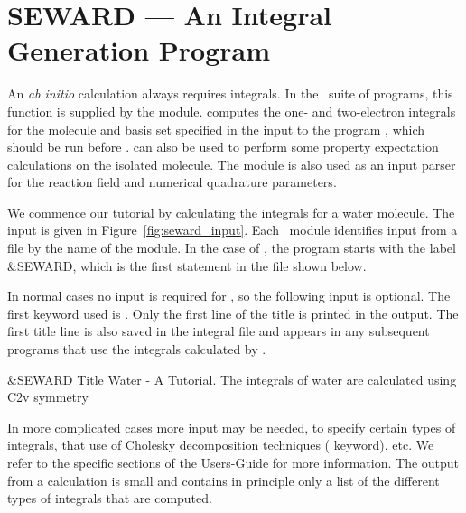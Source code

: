 \section{SEWARD --- An Integral Generation Program}
\label{TUT:sec:seward}

An {\em ab initio} calculation always requires integrals. In the
\molcas\ suite of programs, this function is supplied by the  
module.  computes the one- and two-electron integrals for the
molecule and basis set specified in the input to the program ,
which should be run before .  can also be used 
to perform some property expectation calculations on the isolated molecule.
The module is also used as an input parser for the reaction field and
numerical quadrature parameters.

We commence our tutorial by calculating the integrals for a water molecule. The 
input is given in Figure~\ref{fig:seward_input}.  Each \molcas\ module
identifies input from a file by the name of the module.  In the case of 
, the program starts with the label
\&SEWARD, which is the first statement in the file shown below.

In normal cases no input is required for , so the following
input is optional. The first keyword used is . Only the first
line of the title is printed in the output. The first title line is also saved 
in the integral file and appears in any subsequent programs that use the 
integrals calculated by .

\label{fig:seward_input}
\begin{inputlisting}
 &SEWARD
Title
 Water - A Tutorial. The integrals of water are calculated using C2v symmetry
\end{inputlisting}

In more complicated cases more input may be needed, to specify certain types of
integrals, that use of Cholesky decomposition techniques ( keyword), etc. We refer to the
specific sections of the Users-Guide for more information.
The output from a  calculation is small and contains in principle
only a list of the different types of integrals that are computed.

